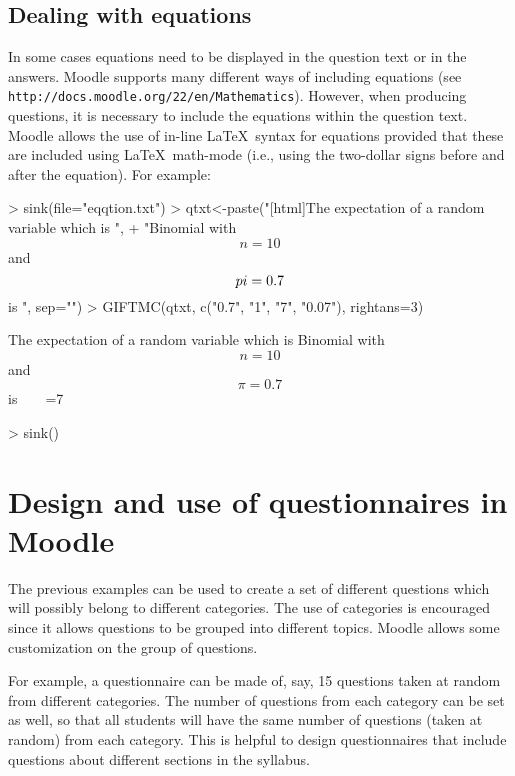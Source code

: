\documentclass[a4paper]{article}
\begin{document}
\subsection{Dealing with equations}

In some cases equations need to be displayed in the question text or in the answers.
Moodle supports many different ways of including equations (see 
\verb+http://docs.moodle.org/22/en/Mathematics+). However, when producing
questions, it is necessary to include the equations within the question text.
Moodle allows the use of in-line \LaTeX\ syntax for equations provided that
these are included using \LaTeX\ math-mode (i.e., using the two-dollar signs
before and after the equation). For example:


\begin{Schunk}
\begin{Sinput}
> sink(file="eqqtion.txt")
> qtxt<-paste("[html]The expectation of a random variable which is \n",
+    "Binomial with $$n=10$$ and $$\\pi=0.7$$ is ", sep="")
> GIFTMC(qtxt, c("0.7", "1", "7", "0.07"), rightans=3)
\end{Sinput}
\begin{Soutput}
[html]The expectation of a random variable which is 
Binomial with $$n=10$$ and $$\pi=0.7$$ is 
{
~%0%0.7
~%0%1
=7
~%0%0.07
}
\end{Soutput}
\begin{Sinput}
> sink()
\end{Sinput}
\end{Schunk}




\section{Design and use of questionnaires in Moodle}

The previous examples can be used to create a set of different questions which
will possibly belong to different categories. The use of categories is
encouraged since it allows questions to be grouped into different topics.
Moodle allows some customization on the group of questions. 

For example, a questionnaire can be made of, say, 15 questions taken at random
from different categories. The number of questions from each category can be
set as well, so that all students will have the same number of questions (taken
at random) from each category.  This is helpful to design questionnaires that
include questions about different sections in the syllabus.
\end{document}
